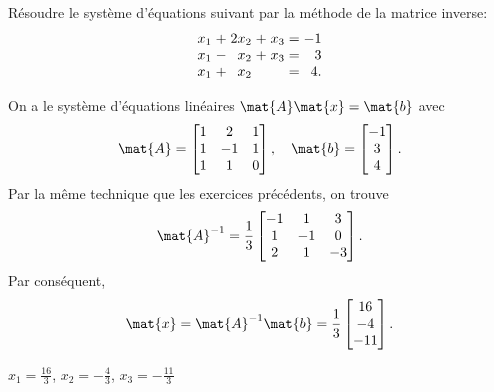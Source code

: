 \begin{exercice}
  Résoudre le système d'équations suivant par la méthode de la matrice
  inverse:
  \begin{displaymath}
    \begin{array}[t]{*{2}{r@{\;}c@{\;}}r@{\;=\;}r}
      x_1 &+& 2x_2 &+& x_3 & -1 \\
      x_1 &-&  x_2 &+& x_3 &  3 \\
      x_1 &+&  x_2 & &     &  4.
    \end{array}
  \end{displaymath}
  \begin{sol}
    On a le système d'équations linéaires $\mat{A} \mat{x} = \mat{b}$ avec
    \begin{displaymath}
      \mat{A} =
      \begin{bmatrix}
        1 & 2 & 1 \\ 1 & - 1 & 1 \\ 1 & 1 & 0
      \end{bmatrix},
      \quad
      \mat{b} =
      \begin{bmatrix}
        -1 \\ 3 \\ 4
      \end{bmatrix}.
    \end{displaymath}
    Par la même technique que les exercices précédents, on trouve
    \begin{displaymath}
      \mat{A}^{-1} = \frac{1}{3}
      \begin{bmatrix}
        -1 & 1 & 3 \\ 1 & -1 & 0 \\ 2 & 1 & -3
      \end{bmatrix}.
    \end{displaymath}
    Par conséquent,
    \begin{displaymath}
      \mat{x} = \mat{A}^{-1} \mat{b} =
      \frac{1}{3}
      \begin{bmatrix}
        16 \\ -4 \\ -11
      \end{bmatrix}.
    \end{displaymath}
  \end{sol}
  \begin{rep}
    $x_1 = \frac{16}{3}$, $x_2 = -\frac{4}{3}$, $x_3 = -\frac{11}{3}$
  \end{rep}
\end{exercice}

